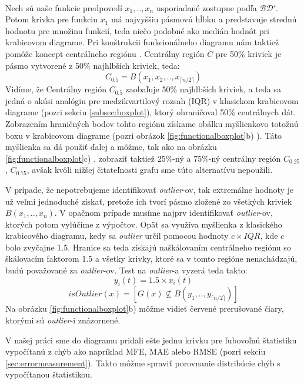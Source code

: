 \paragraph{}
Nech sú naše funkcie predpovedí $ x_{1},.., x_{n} $ usporiadané zostupne podľa $ \mathcal{BD}' $. Potom krivka pre funkciu $ x_{1} $ má najvyššiu pásmovú hĺbku a predstavuje strednú hodnotu pre množinu funkcií, teda niečo podobné ako medián hodnôt pri krabicovom diagrame. Pri konštrukcii funkcionálneho diagramu nám taktiež pomôže koncept centrálneho regiónu \cite{Liu}. Centrálny región $ C $ pre 50\% kriviek je pásmo vytvorené z 50\% najhlbších kriviek, teda:
\[
	C_{0.5} = B(x_{1}, x_{2}, .., x_{\lceil n / 2 \rceil} )
\] 
Vidíme, že Centrálny región $ C_{0.5} $ zaobaľuje 50\% najhlbších kriviek, a teda sa jedná o akúsi analógiu pre medzikvartilový rozsah (IQR) v klasickom krabicovom diagrame (pozri sekciu \ref{subsec:boxplot}), ktorý ohraničoval 50\% centrálnych dát. Zobrazením hraničných bodov tohto regiónu získame obálku myšlienkovo totožnú boxu v krabicovom diagrame (pozri obrázok \ref{fig:functionalboxplot}b) ). Táto myšlienka sa dá použiť ďalej a môžme, tak ako na obrázku \ref{fig:functionalboxplot}c) , zobraziť taktiež 25\%-ný a 75\%-ný centrálny región $ C_{0.25} $, $ C_{0.75} $, avšak kvôli nižšej čitateľnosti grafu sme túto alternatívu nepoužili.

V prípade, že nepotrebujeme identifikovať \textit{outlier}-ov, tak extremálne hodnoty je už veľmi jednoduché získať, pretože ich tvorí pásmo zložené zo všetkých kriviek $ B(x_{1}, .., x_{n}) $. V opačnom prípade musíme najprv identifikovať \textit{outlier}-ov, ktorých potom vylúčime z výpočtov. Opäť sa využíva myšlienka z klasického krabicového diagramu, kedy sa \textit{outlier} určil pomocou hodnoty $ c \times IQR $, kde $ c $ bolo zvyčajne 1.5. Hranice sa teda získajú naškálovaním centrálneho regiónu so škálovacím faktorom 1.5 a všetky krivky, ktoré sa v tomto regióne nenachádzajú, budú považované za \textit{outlier}-ov. Test na \textit{outlier}-a vyzerá teda takto:
\[	y_{i}(t) = 1.5 \times x_{i}(t) \]
\[	isOutlier(x) = [ G(x) \nsubseteq B(y_{1},..,y_{\lceil n / 2 \rceil}) ] \]
Na obrázku \ref{fig:functionalboxplot}b) môžme vidieť červené prerušované čiary, ktorými sú \textit{outlier}-i znázornené.

V našej práci sme do diagramu pridali ešte jednu krivku pre ľubovoľnú štatistiku vypočítanú z chýb ako napríklad MFE, MAE alebo RMSE (pozri sekciu \ref{sec:errormeasurement}). Takto môžme spraviť porovnanie distribúcie chýb s vypočítanou štatistikou.


